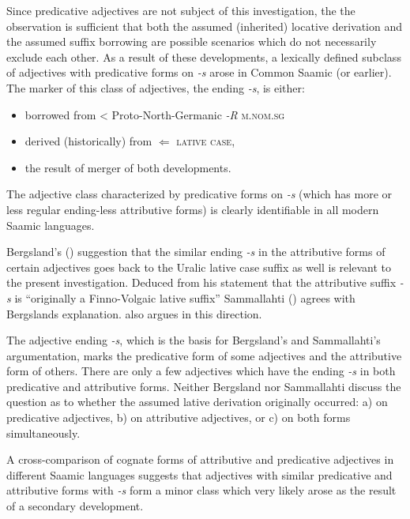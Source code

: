 {Since predicative adjectives are not subject of this investigation, the the observation is sufficient that both the assumed (inherited) locative derivation and the assumed suffix borrowing are possible scenarios which do not necessarily exclude each other. As a result of these developments, a lexically defined subclass of adjectives with predicative forms on \textit{-s} arose in Common Saamic (or earlier). The marker of this class of adjectives, the ending \textit{-s}, is either:
\begin{itemize}
\item borrowed from < Proto-North-Germanic \textit{-R} \textsc{m.nom.sg}
\item derived (historically) from $\Leftarrow$ \textsc{lative case}, %
\item the result of merger of both developments.
\end{itemize}
\noindent The adjective class characterized by predicative forms on \textit{-s} (which has more or less regular ending-less attributive forms) is clearly identifiable in all modern Saamic languages.

Bergsland's (\citeyear[96]{bergsland1946}) suggestion that the similar ending \textit{-s} in the attributive forms of certain adjectives goes back to the Uralic lative case suffix as well is relevant to the present investigation. Deduced from his statement that the attributive suffix \textit{-s} is “originally a Finno-Volgaic lative suffix” Sammallahti (\citeyear[71]{sammallahti1998b}) agrees with Bergslands explanation. \cite{judakin1997} also argues in this direction.

The adjective ending \textit{-s}, which is the basis for Bergsland's and Sammallahti's argumentation, marks the predicative form of some adjectives and the attributive form of others. There are only a few adjectives which have the ending \textit{-s} in both predicative and attributive forms. Neither Bergsland nor Sammallahti discuss the question as to whether the assumed lative derivation originally occurred: a) on predicative adjectives, b) on attributive adjectives, or c) on both forms simultaneously.
 
A cross-comparison of cognate forms of attributive and predicative adjectives in different Saamic languages suggests that adjectives with similar predicative and attributive forms with \textit{-s} form a minor class which very likely arose as the result of a secondary development.

}

